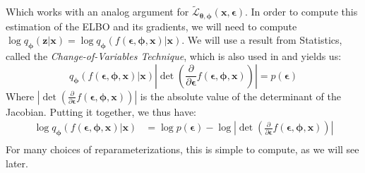 \documentclass[12pt]{report}
\theoremstyle{definition}
\begin{document}
Which works with an analog argument for $\tilde{\mathcal{L}}_{\pmb{\theta}, \pmb{\phi}}(\mathbf{x}, \pmb{\epsilon})$. In order to compute this estimation of the ELBO and its gradients, we will need to compute $\log q_{\pmb{\phi}}(\mathbf{z}|\mathbf{x})=\log q_{\pmb{\phi}}(f(\pmb{\epsilon}, \pmb{\phi}, \mathbf{x})|\mathbf{x})$.
We will use a result from Statistics, called the \emph{Change-of-Variables Technique}, which is also used in \cite{kingma1} and yields us:
\begin{equation}
q_{\pmb{\phi}}(f(\pmb{\epsilon}, \pmb{\phi}, \mathbf{x})|\mathbf{x}) \left|\det \left(\frac{\partial}{\partial \pmb{\epsilon}}f(\pmb{\epsilon}, \pmb{\phi}, \mathbf{x})\right)\right| = p(\pmb{\epsilon})
\end{equation}
Where $\left|\det \left(\frac{\partial}{\partial \pmb{\epsilon}}f(\pmb{\epsilon}, \pmb{\phi}, \mathbf{x})\right)\right|$ is the absolute value of the determinant of the Jacobian. Putting it together, we thus have:
\begin{equation}
\begin{split}
\log q_{\pmb{\phi}}(f(\pmb{\epsilon}, \pmb{\phi}, \mathbf{x})|\mathbf{x}) & = \log p(\pmb{\epsilon}) - \log \left|\det \left(\frac{\partial}{\partial \pmb{\epsilon}}f(\pmb{\epsilon}, \pmb{\phi}, \mathbf{x})\right)\right| \\
\end{split}
\end{equation}
For many choices of reparameterizations, this is simple to compute, as we will see later.
\end{document}
